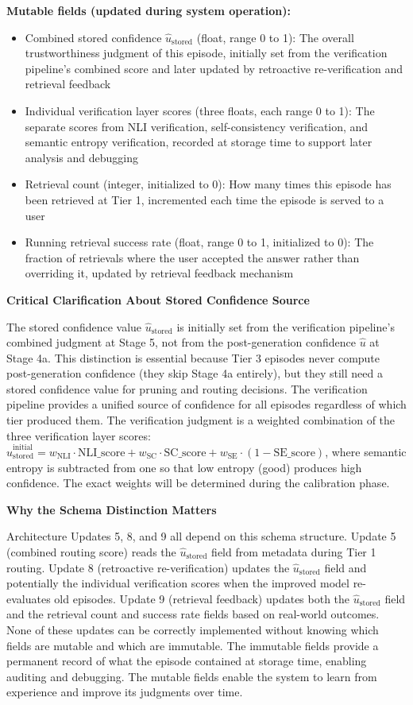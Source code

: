 \documentclass[11pt,a4paper]{article}
\newcommand{\uhat}{\hat{u}}
\newcommand{\ustored}{\hat{u}_{\text{stored}}}
\begin{document}
{\textbf{Mutable fields (updated during system operation):}
\begin{itemize}
\item Combined stored confidence $\ustored$ (float, range 0 to 1): The overall trustworthiness judgment of this episode, initially set from the verification pipeline's combined score and later updated by retroactive re-verification and retrieval feedback
\item Individual verification layer scores (three floats, each range 0 to 1): The separate scores from NLI verification, self-consistency verification, and semantic entropy verification, recorded at storage time to support later analysis and debugging
\item Retrieval count (integer, initialized to 0): How many times this episode has been retrieved at Tier 1, incremented each time the episode is served to a user
\item Running retrieval success rate (float, range 0 to 1, initialized to 0): The fraction of retrievals where the user accepted the answer rather than overriding it, updated by retrieval feedback mechanism
\end{itemize}

\textbf{Critical Clarification About Stored Confidence Source}

The stored confidence value $\ustored$ is initially set from the verification pipeline's combined judgment at Stage 5, not from the post-generation confidence $\uhat$ at Stage 4a. This distinction is essential because Tier 3 episodes never compute post-generation confidence (they skip Stage 4a entirely), but they still need a stored confidence value for pruning and routing decisions. The verification pipeline provides a unified source of confidence for all episodes regardless of which tier produced them. The verification judgment is a weighted combination of the three verification layer scores: $\ustored^{\text{initial}} = w_{\text{NLI}} \cdot \text{NLI\_score} + w_{\text{SC}} \cdot \text{SC\_score} + w_{\text{SE}} \cdot (1 - \text{SE\_score})$, where semantic entropy is subtracted from one so that low entropy (good) produces high confidence. The exact weights will be determined during the calibration phase.

\textbf{Why the Schema Distinction Matters}

Architecture Updates 5, 8, and 9 all depend on this schema structure. Update 5 (combined routing score) reads the $\ustored$ field from metadata during Tier 1 routing. Update 8 (retroactive re-verification) updates the $\ustored$ field and potentially the individual verification scores when the improved model re-evaluates old episodes. Update 9 (retrieval feedback) updates both the $\ustored$ field and the retrieval count and success rate fields based on real-world outcomes. None of these updates can be correctly implemented without knowing which fields are mutable and which are immutable. The immutable fields provide a permanent record of what the episode contained at storage time, enabling auditing and debugging. The mutable fields enable the system to learn from experience and improve its judgments over time.

}
\end{document}
